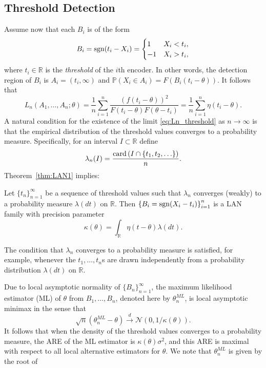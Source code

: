 \subsection{Threshold Detection \label{subsec:threshold}}
Assume now that each $B_i$ is of the form
\begin{equation}
\label{eq:threshold_message}
B_i = \mathrm{sgn}(t_i - X_i) = \begin{cases} 1 & X_i< t_i, \\
-1 & X_i > t_i,
\end{cases}  
\end{equation}
where $t_i\in\mathbb R$ is the \emph{threshold} of the $i$th encoder. In other words, the detection region of $B_i$ is $A_i = (t_i,\infty)$ and $\mathbb P(X_i \in A_i) = F \left( B_i(t_i-\theta) \right)$. It follows that
\begin{equation}
L_n(A_1,\ldots,A_n;\theta) = \frac{1}{n} \sum_{i=1}^n \frac{ \left(f(t_i-\theta) \right)^2 }{F\left(t_i-\theta \right) F\left(\theta - t_i \right) }  = \frac{1}{n} \sum_{i=1}^n \eta(t_i - \theta).
\label{eq:Ln_threshold}
\end{equation}
A natural condition for the existence of the limit \eqref{eq:Ln_threshold} as $n\to \infty$ is that the empirical distribution of the threshold values converges to a probability measure. Specifically, for an interval $I \subset \mathbb R$ define
\[
\lambda_n(I) = \frac{ \mathrm{card} \left( I \cap \{t_1,t_2,\ldots \} \right)}{n}. 
\]
Theorem~\ref{thm:LAN1} implies:
\begin{cor} \label{cor:LAN_thresh}
Let $\{t_n\}_{n=1}^\infty$ be a sequence of threshold values such that $\lambda_n$ converges (weakly) to a probability measure $\lambda(dt)$ on $\mathbb R$. Then $\left\{ B_i = \mathrm{sgn}(X_i - t_i) \right\}_{i=1}^n$ is a LAN family with precision parameter
\[
\kappa(\theta) = \int_{\mathbb R} \eta(t-\theta) \lambda(dt). 
\]
\end{cor}
The condition that $\lambda_n$ converges to a probability measure is satisfied, for example, whenever the $t_1,\ldots,t_n$s are drawn independently from a probability distribution $\lambda(dt)$ on $\mathbb R$. \par
Due to local asymptotic normality of $\{B_n\}_{n=1}^\infty$, the maximum likelihood estimator (ML) of $\theta$ from $B_1,\ldots,B_n$, denoted here by 
${\theta}^{ML}_n$, is local asymptotic minimax in the sense that 
\[
\sqrt{n} \left( {\theta}^{ML}_n - \theta \right) \overset{d}{\longrightarrow} \mathcal{N} \left(0, 1/\kappa(\theta) \right). 
\]
It follows that when the density of the threshold values converges to a probability measure, the ARE of the ML estimator is $\kappa(\theta)\sigma^2$, and this ARE is maximal with respect to all local alternative estimators for $\theta$. We note that ${\theta}^{ML}_n$ is given by the root of 

